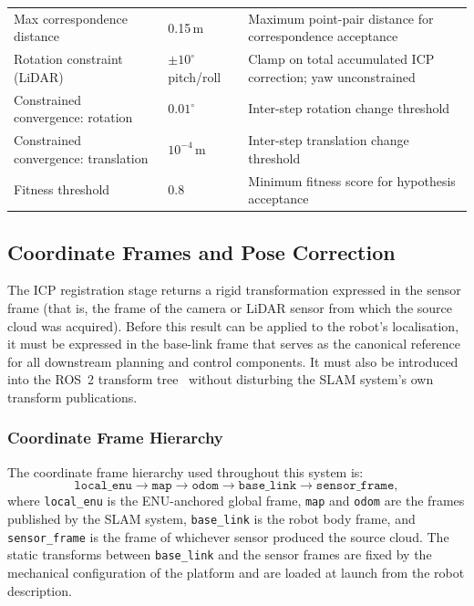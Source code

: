 \begin{table}[htbp]
\begin{tabularx}{\textwidth}{@{} >{\raggedright}p{} >{\raggedright}p{} >{\raggedright\arraybackslash}X @{}}
    Max correspondence distance     & 0.15\,m             & Maximum point-pair distance for correspondence acceptance \\
    Rotation constraint (LiDAR)     & $\pm 10^{\circ}$ pitch/roll & Clamp on total accumulated ICP correction; yaw unconstrained \\
    Constrained convergence: rotation    & $0.01^{\circ}$ & Inter-step rotation change threshold \\
    Constrained convergence: translation & $10^{-4}$\,m   & Inter-step translation change threshold \\
    Fitness threshold               & 0.8                 & Minimum fitness score for hypothesis acceptance \\
    \bottomrule
  \end{tabularx}
\end{table}

\subsection{Coordinate Frames and Pose Correction}
\label{subsec:pa-pose-correction}

The ICP registration stage returns a rigid transformation expressed in the sensor frame (that is, the frame of the camera or LiDAR sensor from which the source cloud was acquired). Before this result can be applied to the robot's localisation, it must be expressed in the base-link frame that serves as the canonical reference for all downstream planning and control components. It must also be introduced into the ROS~2 transform tree~\cite{macenskiRobotOperatingSystem2022} without disturbing the SLAM system's own transform publications.

\subsubsection*{Coordinate Frame Hierarchy}

The coordinate frame hierarchy used throughout this system is:
\[
  \texttt{local\_enu} \to \texttt{map} \to \texttt{odom} \to \texttt{base\_link} \to \texttt{sensor\_frame},
\]
where \texttt{local\_enu} is the ENU-anchored global frame, \texttt{map} and \texttt{odom} are the frames published by the SLAM system, \texttt{base\_link} is the robot body frame, and \texttt{sensor\_frame} is the frame of whichever sensor produced the source cloud. The static transforms between \texttt{base\_link} and the sensor frames are fixed by the mechanical configuration of the platform and are loaded at launch from the robot description.

